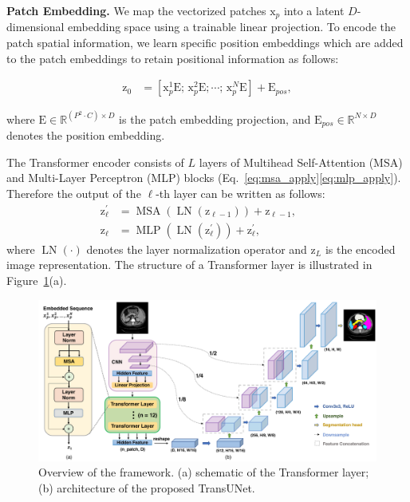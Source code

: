 \documentclass[runningheads]{llncs}
\newcommand*{\op}[1]{\operatorname{#1}}
\begin{document}
\vspace{1ex}\noindent\textbf{Patch Embedding.} We map the vectorized patches $\bm{\mathrm{x}}_p$ into a latent $D$-dimensional embedding space using a trainable linear projection.
To encode the patch spatial information, we learn specific position embeddings which are added to the patch embeddings to retain positional information as follows:


\begin{align}
    \bm{\mathrm{z}}_0 &= [\bm{\mathrm{x}}^1_p \bm{\mathrm{E}}; \, \bm{\mathrm{x}}^2_p \bm{\mathrm{E}}; \cdots; \, \bm{\mathrm{x}}^{N}_p \bm{\mathrm{E}} ] + \bm{\mathrm{E}}_{pos}, \label{eq:embedding} 
\end{align}


\noindent where $\bm{\mathrm{E}} \in \mathbb{R}^{(P^2 \cdot C) \times D}$ is the patch embedding projection, and $\bm{\mathrm{E}}_{pos}  \in \mathbb{R}^{N \times D}$ denotes the position embedding. 


The Transformer encoder consists of $L$ layers of Multihead Self-Attention (MSA) and Multi-Layer Perceptron (MLP) blocks (Eq.~\eqref{eq:msa_apply}\eqref{eq:mlp_apply}). Therefore the output of the $\ell$-th layer can be written as follows:
\begin{align}
    \bm{\mathrm{z}}^\prime_\ell &= \op{MSA}(\op{LN}(\bm{\mathrm{z}}_{\ell-1})) + \bm{\mathrm{z}}_{\ell-1}, &&  \label{eq:msa_apply} \\
    \bm{\mathrm{z}}_\ell &= \op{MLP}(\op{LN}(\bm{\mathrm{z}}^\prime_{\ell})) + \bm{\mathrm{z}}^\prime_{\ell},   \label{eq:mlp_apply} 
\end{align}
where $\op{LN}(\cdot)$ denotes the layer normalization operator and $\bm{\mathrm{z}}_L$ is the encoded image representation. The structure of a Transformer layer is illustrated in Figure~\ref{fig:framework}(a).


\begin{figure}[t!]
    \centering
    \includegraphics[width=\textwidth]{transunet_v2.pdf}
    \caption{Overview of the framework. (a) schematic of the Transformer layer; (b) architecture of the proposed TransUNet.
    }
    \label{fig:framework}
\end{figure}
\end{document}

